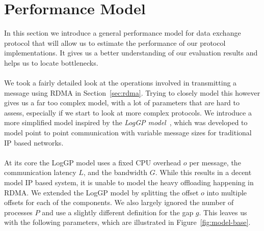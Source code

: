 \section{Performance Model}\label{sec:perf-model} \label{sec:model}
In this section we introduce a general performance model for data exchange protocol that will allow us to estimate the 
performance of our protocol implementations. It gives us a better understanding of our evaluation results and helps us 
to locate bottlenecks.

\paragraph{}We took a fairly detailed look at the operations involved in transmitting a message using RDMA in Section~\ref{sec:rdma}.
Trying to closely model this however gives us a far too complex model, with a lot of parameters that are hard to assess,
especially if we start to look at more complex protocols. We introduce a more simplified model inspired by the  
\emph{LogGP model}~\cite{loggp}, which was developed  to model point to point communication with variable message sizes for 
traditional IP based networks.

\paragraph{} At its core the LogGP model uses a fixed CPU overhead $o$ per message, the communication latency $L$, and 
the bandwidth $G$. While this results in a decent model IP based system, it is unable to model the heavy offloading happening
in RDMA. We extended the LogGP model by splitting the offset $o$ into multiple offsets for each of the components. We also 
largely ignored the number of processes $P$ and use a slightly different definition for the gap $g$. This leaves 
us with the following parameters, which are illustrated in Figure~\ref{fig:model-base}.

